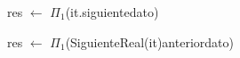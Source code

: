 \begin{algorithm}[H]
\begin{algorithmic}[1]
 
	\State res $\gets$ $\Pi_{1}$(it.siguiente\rightarrow dato) 
\EndFunction
\end{algorithmic}
\end{algorithm}
	
	
\begin{algorithm}[H]
\begin{algorithmic}[1]	
 
	\State res $\gets$ $\Pi_{1}$(SiguienteReal(it)\rightarrow anterior\rightarrow dato)	
\EndFunction
\end{algorithmic}
\end{algorithm}